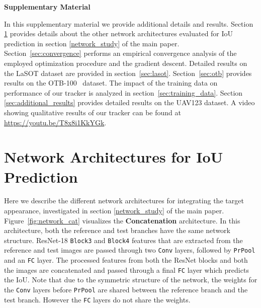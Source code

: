 \documentclass[10pt,twocolumn,letterpaper]{article}
\begin{document}
{\small


}

\clearpage
\setcounter{equation}{0}
\setcounter{figure}{0}
\setcounter{table}{0}
\setcounter{section}{0}

\renewcommand{\theequation}{S\arabic{equation}}
\renewcommand{\thefigure}{S\arabic{figure}}
\renewcommand{\thetable}{S\arabic{table}}
\renewcommand{\thesection}{S\arabic{section}}

\begin{center}
	\textbf{\large Supplementary Material}
\end{center}

	In this supplementary material we provide additional details and results. Section \ref{sec:network_architecures} provides details about the other network architectures evaluated for IoU prediction in section \ref{network_study} of the main paper. Section~\ref{sec:convergence} performs an empirical convergence analysis of the employed optimization procedure and the gradient descent. Detailed results on the LaSOT \cite{LaSOT} dataset are provided in section~\ref{sec:lasot}. Section~\ref{sec:otb} provides results on the OTB-100~\cite{OTB2015} dataset. The impact of the training data on performance of our tracker is analyzed in section~\ref{sec:training_data}. Section \ref{sec:additional_results} provides detailed results on the UAV123 dataset. A video showing qualitative results of our tracker can be found at \url{https://youtu.be/T8x8i1KkYGk}.
	

	
	\section{Network Architectures for IoU Prediction}
	\label{sec:network_architecures}
	Here we describe the different network architectures for integrating the target appearance, investigated in section \ref{network_study} of the main paper. Figure~\ref{fig:network_cat} visualizes the \textbf{Concatenation} architecture. In this architecture, both the reference and test branches have the same network structure. ResNet-18 \texttt{Block3} and  \texttt{Block4} features that are extracted from the reference and test images are passed through two \texttt{Conv} layers, followed by \texttt{PrPool} and an \texttt{FC} layer. The processed features from both the ResNet blocks and both the images are concatenated and passed through a final \texttt{FC} layer which predicts the IoU. Note that due to the symmetric structure of the network, the weights for the \texttt{Conv} layers before \texttt{PrPool} are shared between the reference branch and the test branch. However the \texttt{FC} layers do not share the weights.
	
\end{document}
